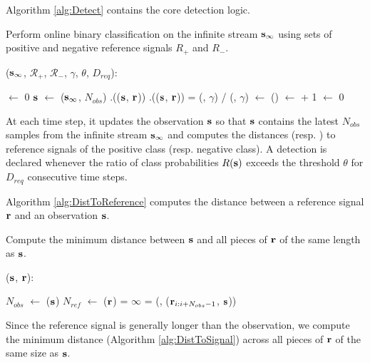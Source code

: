 Algorithm \ref{alg:Detect} contains the core detection logic. 
\begin{algorithm}
\caption{Perform online binary classification on the infinite stream $\mathbf
  s_{\infty}$ using sets of positive and negative reference signals $R_+$ and
  $R_-$.}
\label{alg:Detect}
($\mathbf s_{\infty}$, $\mathcal{R}_+$, $\mathcal{R}_-$, $\gamma$, $\theta$,
$D_{req}$):
\begin{algorithmic}[1]
\STATE {} $\leftarrow$ 0
\LOOP
  \STATE $\mathbf s$ $\leftarrow$ ($\mathbf s_{\infty}$, $N_{obs}$)
    \STATE {}.(($\mathbf s$, $\mathbf r$))
  \ENDFOR
    \STATE {}.(($\mathbf s$, $\mathbf r$))
  \ENDFOR
  \STATE {} = (, $\gamma$) / (, $\gamma$)
      \STATE {} $\leftarrow$ ()
      \RETURN {}
    \ELSE
      \STATE {} $\leftarrow$  + 1
    \ENDIF
  \ELSE
    \STATE {} $\leftarrow$ 0
  \ENDIF
\ENDLOOP
\end{algorithmic}
\end{algorithm}
At each time step, it updates the observation $\mathbf
s$ so that $\mathbf s$ contains the latest $N_{obs}$ samples from the infinite
stream $\mathbf s_{\infty}$ and computes the distances 
(resp. ) to reference signals of the positive class (resp. negative
class). A detection is declared whenever the ratio of class probabilities
$R(\mathbf s)$ exceeds the threshold $\theta$ for $D_{req}$ consecutive time steps.

Algorithm \ref{alg:DistToReference} computes the distance between a reference
signal $\mathbf r$ and an observation $\mathbf s$. 
\begin{algorithm}
\caption{Compute the minimum distance between $\mathbf s$ and all pieces of $\mathbf r$
  of the same length as $\mathbf s$.}
\label{alg:DistToReference}
($\mathbf s$, $\mathbf r$):
\begin{algorithmic}[1]
  \STATE $N_{obs}$ $\leftarrow$ ($\mathbf s$)
  \STATE $N_{ref}$ $\leftarrow$ ($\mathbf r$)
  \STATE {} = $\infty$
    \STATE {} = (, ($\mathbf r_{i:i+N_{obs}-1}$, $\mathbf s$))
  \ENDFOR
  \RETURN {}
\end{algorithmic}
\end{algorithm}
Since the reference signal is generally longer than the observation, we compute
the minimum distance (Algorithm \ref{alg:DistToSignal}) across all pieces of
$\mathbf r$ of the same size as $\mathbf s$.

